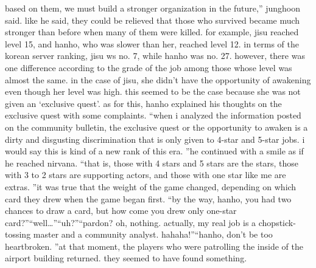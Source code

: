  based on them, we must build a stronger organization in the future,” junghoon said.
like he said, they could be relieved that those who survived became much stronger than before when many of them were killed.
for example, jisu reached level 15, and hanho, who was slower than her, reached level 12.
in terms of the korean server ranking, jisu ws no.
 7, while hanho was no.
 27.
however, there was one difference according to the grade of the job among those whose level was almost the same.
 in the case of jisu, she didn’t have the opportunity of awakening even though her level was high.
 this seemed to be the case because she was not given an ‘exclusive quest’.
as for this, hanho explained his thoughts on the exclusive quest with some complaints.
“when i analyzed the information posted on the community bulletin, the exclusive quest or the opportunity to awaken is a dirty and disgusting discrimination that is only given to 4-star and 5-star jobs.
 i would say this is kind of a new rank of this era.
”he continued with a smile as if he reached nirvana.
“that is, those with 4 stars and 5 stars are the stars, those with 3 to 2 stars are supporting actors, and those with one star like me are extras.
”it was true that the weight of the game changed, depending on which card they drew when the game began first.
“by the way, hanho, you had two chances to draw a card, but how come you drew only one-star card?”“well…”“uh?”“pardon? oh, nothing.
 actually, my real job is a chopstick-tossing master and a community analyst.
 hahaha!”“hanho, don’t be too heartbroken.
”at that moment, the players who were patrolling the inside of the airport building returned.
they seemed to have found something.

